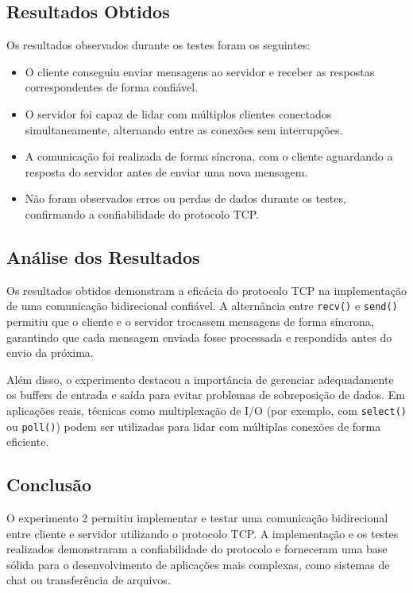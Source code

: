 \documentclass{article}
\begin{document}
\subsection{Resultados Obtidos}

Os resultados observados durante os testes foram os seguintes:

\begin{itemize}
    \item O cliente conseguiu enviar mensagens ao servidor e receber as respostas correspondentes de forma confiável.
    \item O servidor foi capaz de lidar com múltiplos clientes conectados simultaneamente, alternando entre as conexões sem interrupções.
    \item A comunicação foi realizada de forma síncrona, com o cliente aguardando a resposta do servidor antes de enviar uma nova mensagem.
    \item Não foram observados erros ou perdas de dados durante os testes, confirmando a confiabilidade do protocolo TCP.
\end{itemize}

\subsection{Análise dos Resultados}

Os resultados obtidos demonstram a eficácia do protocolo TCP na implementação de uma comunicação bidirecional confiável. A alternância entre \texttt{recv()} e \texttt{send()} permitiu que o cliente e o servidor trocassem mensagens de forma síncrona, garantindo que cada mensagem enviada fosse processada e respondida antes do envio da próxima.

Além disso, o experimento destacou a importância de gerenciar adequadamente os buffers de entrada e saída para evitar problemas de sobreposição de dados. Em aplicações reais, técnicas como multiplexação de I/O (por exemplo, com \texttt{select()} ou \texttt{poll()}) podem ser utilizadas para lidar com múltiplas conexões de forma eficiente.

\subsection{Conclusão}

O experimento 2 permitiu implementar e testar uma comunicação bidirecional entre cliente e servidor utilizando o protocolo TCP. A implementação e os testes realizados demonstraram a confiabilidade do protocolo e forneceram uma base sólida para o desenvolvimento de aplicações mais complexas, como sistemas de chat ou transferência de arquivos.
\end{document}
